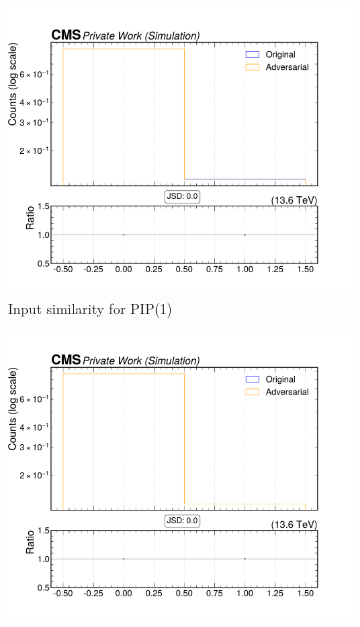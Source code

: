 \begin{figure}[htbp]
  \centering
  \begin{subfigure}[t]{0.32\textwidth}
    \includegraphics[width=\linewidth]{media/output/features/compare/intprob_1/cmp_npf_arr_Npfcan_isGamma.pdf}
    \caption{Input similarity for PIP(1)}
  \end{subfigure}\hfill
  \begin{subfigure}[t]{0.32\textwidth}
    \includegraphics[width=\linewidth]{media/output/features/compare/intprob_2/cmp_npf_arr_Npfcan_isGamma.pdf}

\end{subfigure}
\end{figure}
